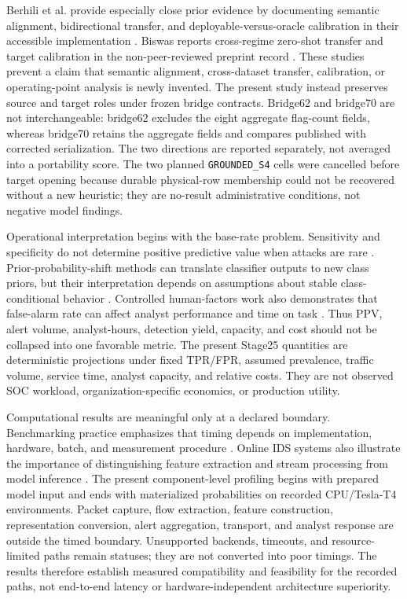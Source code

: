 \documentclass[preprint,12pt]{elsarticle}
\begin{document}
Berhili et al. provide especially close prior evidence by documenting semantic alignment, bidirectional transfer, and deployable-versus-oracle calibration in their accessible implementation \cite{berhili2026protocol}. Biswas reports cross-regime zero-shot transfer and target calibration in the non-peer-reviewed preprint record \cite{biswas2026drift}. These studies prevent a claim that semantic alignment, cross-dataset transfer, calibration, or operating-point analysis is newly invented. The present study instead preserves source and target roles under frozen bridge contracts. Bridge62 and bridge70 are not interchangeable: bridge62 excludes the eight aggregate flag-count fields, whereas bridge70 retains the aggregate fields and compares published with corrected serialization. The two directions are reported separately, not averaged into a portability score. The two planned \texttt{GROUNDED\_S4} cells were cancelled before target opening because durable physical-row membership could not be recovered without a new heuristic; they are no-result administrative conditions, not negative model findings.

Operational interpretation begins with the base-rate problem. Sensitivity and specificity do not determine positive predictive value when attacks are rare \cite{axelsson2000baserate}. Prior-probability-shift methods can translate classifier outputs to new class priors, but their interpretation depends on assumptions about stable class-conditional behavior \cite{saerens2002prior}. Controlled human-factors work also demonstrates that false-alarm rate can affect analyst performance and time on task \cite{layman2023falsealarms}. Thus PPV, alert volume, analyst-hours, detection yield, capacity, and cost should not be collapsed into one favorable metric. The present Stage25 quantities are deterministic projections under fixed TPR/FPR, assumed prevalence, traffic volume, service time, analyst capacity, and relative costs. They are not observed SOC workload, organization-specific economics, or production utility.

Computational results are meaningful only at a declared boundary. Benchmarking practice emphasizes that timing depends on implementation, hardware, batch, and measurement procedure \cite{mattson2020mlperf}. Online IDS systems also illustrate the importance of distinguishing feature extraction and stream processing from model inference \cite{mirsky2018kitsune}. The present component-level profiling begins with prepared model input and ends with materialized probabilities on recorded CPU/Tesla-T4 environments. Packet capture, flow extraction, feature construction, representation conversion, alert aggregation, transport, and analyst response are outside the timed boundary. Unsupported backends, timeouts, and resource-limited paths remain statuses; they are not converted into poor timings. The results therefore establish measured compatibility and feasibility for the recorded paths, not end-to-end latency or hardware-independent architecture superiority.
\end{document}
